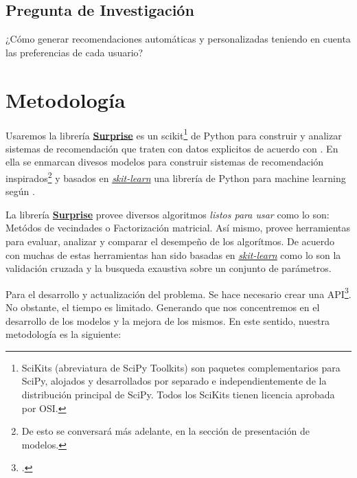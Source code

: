 \documentclass{article}
\begin{document}
\subsection{Pregunta de Investigación}

¿Cómo generar recomendaciones automáticas y personalizadas teniendo en cuenta las preferencias de cada usuario?

\section{Metodología}

Usaremos la librería \href{http://surpriselib.com/}{\textbf{Surprise}} es un scikit\footnote{SciKits (abreviatura de SciPy Toolkits) son paquetes complementarios para SciPy, alojados y desarrollados por separado e independientemente de la distribución principal de SciPy. Todos los SciKits tienen licencia aprobada por OSI.} de Python para construir y analizar sistemas de recomendación que traten con datos explicitos de acuerdo con \cite{Hug2020}.
En ella se enmarcan divesos modelos para construir sistemas de recomendación inspirados\footnote{De esto se conversará más adelante, en la sección de presentación de modelos.} y basados en \href{https://scikit-learn.org/stable/}{\textit{skit-learn}} una librería de Python para machine learning según \cite{scikit-learn}.

La librería \href{http://surpriselib.com/}{\textbf{Surprise}} provee diversos algoritmos \textit{listos para usar} como lo son: Metódos de vecindades o Factorización matricial. Así mismo, provee herramientas para evaluar, analizar y comparar el desempeño de los algorítmos. De acuerdo con \cite{Hug2020} muchas de estas herramientas han sido basadas en \href{https://scikit-learn.org/stable/}{\textit{skit-learn}} como lo son la validación cruzada y la busqueda exaustiva sobre un conjunto de parámetros.

Para el desarrollo y actualización del problema. Se hace necesario crear una API\footcite[Algunas API basadas en experincias con la librería de \textit{skit-learn}]{sklearn_api}.
No obstante, el tiempo es limitado. Generando que nos concentremos en el desarrollo de los modelos y la mejora de los mismos. En este sentido, nuestra metodología es la siguiente:
\end{document}

